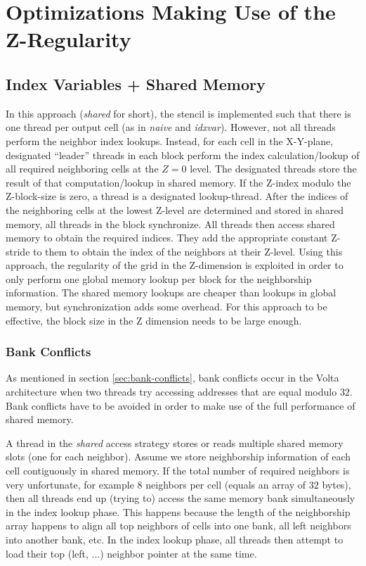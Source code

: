 \section{Optimizations Making Use of the Z-Regularity}

\subsection{Index Variables + Shared Memory} In this approach (\emph{shared} for short), the stencil is implemented such that there is one thread per output cell (as in \emph{naive} and \emph{idxvar}). However, not all threads perform the neighbor index lookups. Instead, for each cell in the X-Y-plane, designated ``leader'' threads in each block perform the index calculation/lookup of all required neighboring cells at the $Z=0$ level. The designated threads store the result of that computation/lookup in shared memory. If the Z-index modulo the Z-block-size is zero, a thread is a designated lookup-thread. After the indices of the neighboring cells at the lowest Z-level are determined and stored in shared memory, all threads in the block synchronize. All threads then access shared memory to obtain the required indices. They add the appropriate constant Z-stride to them to obtain the index of the neighbors at their Z-level. Using this approach, the regularity of the grid in the Z-dimension is exploited in order to only perform one global memory lookup per block for the neighborship information. The shared memory lookups are cheaper than lookups in global memory, but synchronization adds some overhead. For this approach to be effective, the block size in the Z dimension needs to be large enough.

\subsubsection{Bank Conflicts}

As mentioned in section \ref{sec:bank-conflicts}, bank conflicts occur in the Volta architecture when two threads try accessing addresses that are equal modulo $32$. Bank conflicts have to be avoided in order to make use of the full performance of shared memory.

A thread in the \emph{shared} access strategy stores or reads multiple shared memory slots (one for each neighbor). Assume we store neighborship information of each cell contiguously in shared memory. If the total number of required neighbors is very unfortunate, for example $8$ neighbors per cell (equals an array of $32$ bytes), then all threads end up (trying to) access the same memory bank simultaneously in the index lookup phase. This happens because the length of the neighborship array happens to align all top neighbors of cells into one bank, all left neighbors into another bank, etc. In the index lookup phase, all threads then attempt to load their top (left, ...) neighbor pointer at the same time.

